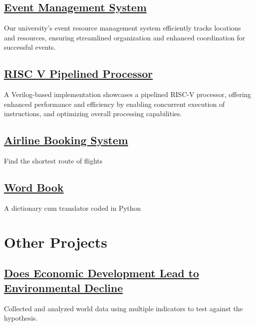 \documentclass[]{resume}
\begin{document}
    \subsection{\href{https://github.com/ZainAU/DBMS-Project}
    {\textbf{Event Management System}}}%
    Our university's event resource management system efficiently tracks locations and resources, ensuring streamlined organization and enhanced coordination for successful events.

    \subsection{\href{https://github.com/aliasgharchakera/CA-Spring22-Project}{\textbf{RISC V Pipelined Processor}}}%
    A Verilog-based implementation showcases a pipelined RISC-V processor, offering enhanced performance and efficiency by enabling concurrent execution of instructions, and optimizing overall processing capabilities.

    \subsection{\href{https://github.com/aliasgharchakera/DSA-Spring21-Project}{\textbf{Airline Booking System}}}%
    Find the shortest route of flights

    \subsection{\href{https://github.com/aliasgharchakera/Pfun-Fall20-Project}{\textbf{Word Book}}}%
    A dictionary cum translator coded in Python


\section{\Large{Other Projects}}

    \subsection{\href{https://coral-elna-8.tiiny.site/}
    {\textbf{Does Economic Development Lead to Environmental Decline}}}%
    Collected and analyzed world data using multiple indicators to test against the hypothesis.
 
\end{document}
